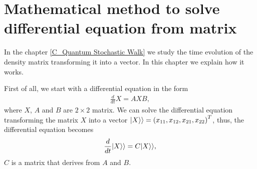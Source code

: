 \chapter{Mathematical method to solve differential equation from matrix}\label{A_vectorial_density_matrix}

In the chapter \ref{C_Quantum Stochastic Walk} we study the time evolution of the density matrix transforming it into a vector. In this chapter we explain how it works.

First of all, we start with a differential equation in the form
\begin{eqnarray}
    \frac{d}{dt} X = A X B,
\end{eqnarray}
where $X$, $A$ and $B$ are $2\times 2$ matrix. 
We can solve the differential equation transforming the matrix $X$ into a vector $\lvert X\rangle\rangle = \left(x_{11}, x_{12},x_{21}, x_{22}\right)^T$, thus, the differential equation becomes
\begin{equation}
    \frac{d}{dt} \lvert X\rangle\rangle = C \lvert X\rangle\rangle,
\end{equation}
$C$ is a matrix that derives from $A$ and $B$.

